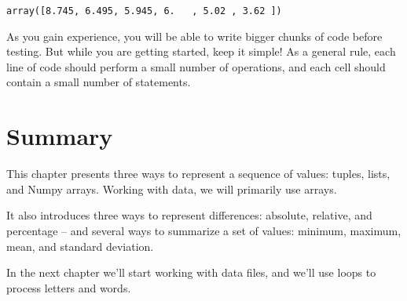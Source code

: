 \begin{lstlisting}[style=output]
array([8.745, 6.495, 5.945, 6.   , 5.02 , 3.62 ])
\end{lstlisting}

As you gain experience, you will be able to write bigger chunks of code
before testing. But while you are getting started, keep it simple! As a
general rule, each line of code should perform a small number of
operations, and each cell should contain a small number of statements.

\section{Summary}\label{summary}

This chapter presents three ways to represent a sequence of values:
tuples, lists, and Numpy arrays. Working with data, we will primarily
use arrays.

It also introduces three ways to represent differences: absolute,
relative, and percentage -- and several ways to summarize a set of
values: minimum, maximum, mean, and standard deviation.

In the next chapter we'll start working with data files, and we'll use
loops to process letters and words.

